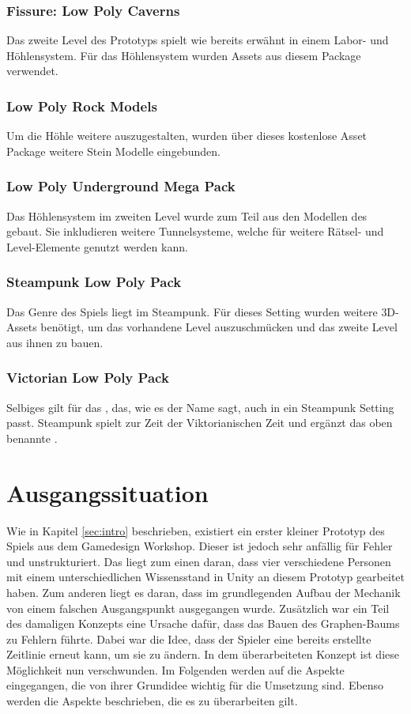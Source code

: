 \subsubsection{Fissure: Low Poly Caverns}
Das zweite Level des Prototyps spielt wie bereits erwähnt in einem Labor- und Höhlensystem. Für das Höhlensystem wurden Assets aus diesem Package verwendet.

\subsubsection{Low Poly Rock Models}
Um die Höhle weitere auszugestalten, wurden über dieses kostenlose Asset Package weitere Stein Modelle eingebunden.

\subsubsection{Low Poly Underground Mega Pack}
Das Höhlensystem im zweiten Level wurde zum Teil aus den Modellen des  gebaut. Sie inkludieren weitere Tunnelsysteme, welche für weitere Rätsel- und Level-Elemente genutzt werden kann. 

\subsubsection{Steampunk Low Poly Pack}
Das Genre des Spiels liegt im Steampunk. Für dieses Setting wurden weitere \ac{3D}-Assets benötigt, um das vorhandene Level auszuschmücken und das zweite Level aus ihnen zu bauen.

\subsubsection{Victorian Low Poly Pack}
Selbiges gilt für das , das, wie es der Name sagt, auch in ein Steampunk Setting passt. Steampunk spielt zur Zeit der Viktorianischen Zeit und ergänzt das oben benannte .


\section{Ausgangssituation}
Wie in Kapitel \ref{sec:intro}  beschrieben, existiert ein erster kleiner Prototyp des Spiels aus dem Gamedesign Workshop. Dieser ist jedoch sehr anfällig für Fehler und unstrukturiert. Das liegt zum einen daran, dass vier verschiedene Personen mit einem unterschiedlichen Wissensstand in Unity an diesem Prototyp gearbeitet haben. Zum anderen liegt es daran, dass im grundlegenden Aufbau der Mechanik von einem falschen Ausgangspunkt ausgegangen wurde. Zusätzlich war ein Teil des damaligen Konzepts eine Ursache dafür, dass das Bauen des Graphen-Baums zu Fehlern führte. Dabei war die Idee, dass der Spieler eine bereits erstellte Zeitlinie erneut  kann, um sie zu ändern. In dem überarbeiteten Konzept ist diese Möglichkeit nun verschwunden. Im Folgenden werden auf die Aspekte eingegangen, die von ihrer Grundidee wichtig für die Umsetzung sind. Ebenso werden die  Aspekte beschrieben, die es zu überarbeiten gilt.
